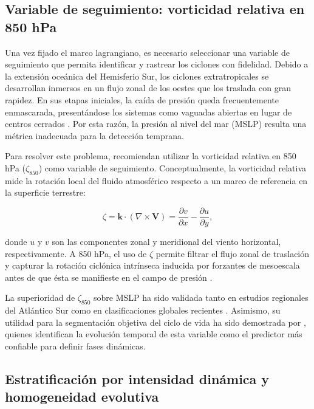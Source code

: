 \subsection{Variable de seguimiento: vorticidad relativa en 850 hPa}\label{subsec:tb_zeta}

Una vez fijado el marco lagrangiano, es necesario seleccionar una variable de seguimiento que permita identificar y rastrear los ciclones con fidelidad. 
Debido a la extensión oceánica del Hemisferio Sur, los ciclones extratropicales se desarrollan inmersos en un flujo zonal de los oestes que los traslada con gran rapidez. 
En sus etapas iniciales, la caída de presión queda frecuentemente enmascarada, presentándose los sistemas como vaguadas abiertas en lugar de centros cerrados \citep{sinclair1994objective}. 
Por esta razón, la presión al nivel del mar (MSLP) resulta una métrica inadecuada para la detección temprana.

Para resolver este problema, \citet{sinclair1997objective} recomiendan utilizar la vorticidad relativa en 850 hPa ($\zeta_{850}$) como variable de seguimiento. 
Conceptualmente, la vorticidad relativa mide la rotación local del fluido atmosférico respecto a un marco de referencia en la superficie terrestre:

\begin{equation}\label{eq:vorticidad_relativa}
\zeta = \mathbf{k} \cdot (\nabla \times \mathbf{V}) = \frac{\partial v}{\partial x} - \frac{\partial u}{\partial y},
\end{equation}

\noindent donde $u$ y $v$ son las componentes zonal y meridional del viento horizontal, respectivamente. A 850 hPa, el uso de $\zeta$ permite filtrar el flujo zonal de traslación y capturar la rotación ciclónica intrínseca inducida por forzantes de mesoescala antes de que ésta se manifieste en el campo de presión \citep{hoskins2005new}. 

La superioridad de $\zeta_{850}$ sobre MSLP ha sido validada tanto en estudios regionales del Atlántico Sur \citep{gramcianinov2019properties,padilhareinke2024objective} como en clasificaciones globales recientes \citep{corner2025classification}. Asimismo, su utilidad para la segmentación objetiva del ciclo de vida ha sido demostrada por \citet{coutodesouza2024new}, quienes identifican la evolución temporal de esta variable como el predictor más confiable para definir fases dinámicas.

\subsection{Estratificación por intensidad dinámica y homogeneidad evolutiva}\label{subsec:tb_poblaciones}

